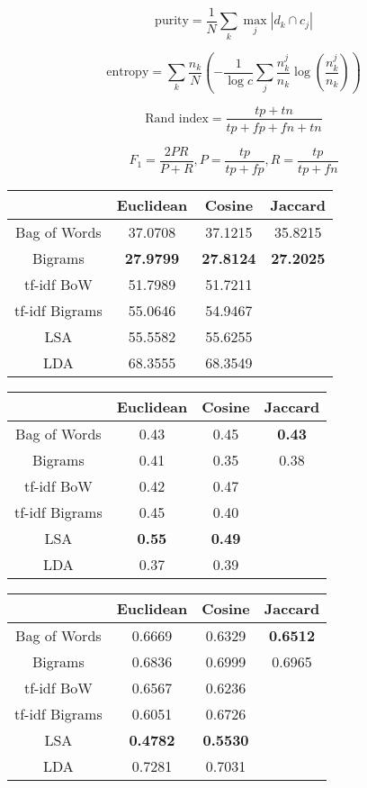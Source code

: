 \documentclass[10pt]{article}
\begin{document}
\[ \text{purity} = \frac{1}{N} \sum_k \max_j |d_k \cap c_j |\]

\[ \text{entropy} = \sum_k \frac{n_k}{N} \left( -\frac{1}{\log c} \sum_j \frac{n^j_k}{n_k} \log \left(\frac{n^j_k}{n_k}\right) \right) \]

\[ \text{Rand index} = \frac{tp + tn}{tp + fp + fn + tn}  \]

\[ F_1 = \frac{2PR}{P + R}, P = \frac{tp}{tp + fp}, R = \frac{tp}{tp + fn} \]

\begin{center}
\begin{tabular}{|c|c|c|c|}
  \hline
  ~ & Euclidean & Cosine & Jaccard \\ \hline \hline
  Bag of Words & 37.0708 & 37.1215 & 35.8215 \\ \hline
  Bigrams & \textbf{27.9799} & \textbf{27.8124} & \textbf{27.2025} \\ \hline
  tf-idf BoW & 51.7989 & 51.7211 & \\ \hline
  tf-idf Bigrams & 55.0646 & 54.9467 & \\ \hline
  LSA & 55.5582 & 55.6255 & \\ \hline
  LDA & 68.3555 & 68.3549 & \\ \hline
\end{tabular}
\end{center}

\begin{center}
\begin{tabular}{|c|c|c|c|}
 \hline
  & Euclidean & Cosine & Jaccard \\ \hline \hline
  Bag of Words & 0.43 & 0.45 & \textbf{0.43} \\ \hline
  Bigrams & 0.41 & 0.35 & 0.38 \\ \hline
  tf-idf BoW & 0.42 & 0.47 & \\ \hline
  tf-idf Bigrams & 0.45 & 0.40 & \\ \hline
  LSA & \textbf{0.55} & \textbf{0.49} & \\ \hline
  LDA & 0.37 & 0.39 & \\ \hline
\end{tabular}
\end{center}


\begin{center}
\begin{tabular}{|c|c|c|c|}
  \hline
  & Euclidean & Cosine & Jaccard \\ \hline \hline
  Bag of Words & 0.6669 & 0.6329 & \textbf{0.6512} \\ \hline
  Bigrams & 0.6836 & 0.6999 & 0.6965 \\ \hline
  tf-idf BoW & 0.6567 & 0.6236 &  \\ \hline
  tf-idf Bigrams & 0.6051 & 0.6726 &  \\ \hline
  LSA & \textbf{0.4782} & \textbf{0.5530} & \\ \hline
  LDA & 0.7281 & 0.7031 & \\ \hline
\end{tabular}
\end{center}
\end{document}
